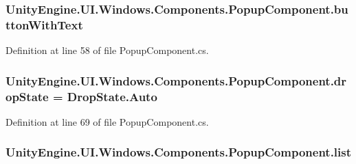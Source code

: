 \subsubsection[{button\+With\+Text}]{ Unity\+Engine.\+U\+I.\+Windows.\+Components.\+Popup\+Component.\+button\+With\+Text}\label{class_unity_engine_1_1_u_i_1_1_windows_1_1_components_1_1_popup_component_aecf4dea9a4ea3aed663ea8d0892bcff7}


Definition at line 58 of file Popup\+Component.\+cs.

\hypertarget{class_unity_engine_1_1_u_i_1_1_windows_1_1_components_1_1_popup_component_a136e98d3cd731e62ef50d146bbef179d}{}
\subsubsection[{drop\+State}]{ Unity\+Engine.\+U\+I.\+Windows.\+Components.\+Popup\+Component.\+drop\+State = Drop\+State.\+Auto}\label{class_unity_engine_1_1_u_i_1_1_windows_1_1_components_1_1_popup_component_a136e98d3cd731e62ef50d146bbef179d}


Definition at line 69 of file Popup\+Component.\+cs.

\hypertarget{class_unity_engine_1_1_u_i_1_1_windows_1_1_components_1_1_popup_component_aeffe7880525d2549c097305bf5b412c8}{}
\subsubsection[{list}]{ Unity\+Engine.\+U\+I.\+Windows.\+Components.\+Popup\+Component.\+list}\label{class_unity_engine_1_1_u_i_1_1_windows_1_1_components_1_1_popup_component_aeffe7880525d2549c097305bf5b412c8}


